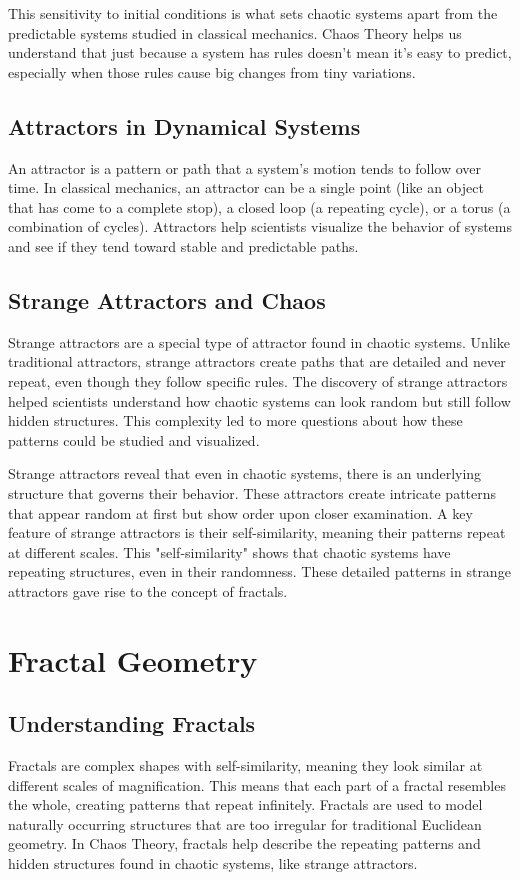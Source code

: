 \documentclass[12pt]{article}
\begin{document}
This sensitivity to initial conditions is what sets chaotic systems apart from the predictable systems studied in classical mechanics. Chaos Theory helps us understand that just because a system has rules doesn’t mean it’s easy to predict, especially when those rules cause big changes from tiny variations.

\subsection{Attractors in Dynamical Systems}
An attractor is a pattern or path that a system’s motion tends to follow over time. In classical mechanics, an attractor can be a single point (like an object that has come to a complete stop), a closed loop (a repeating cycle), or a torus (a combination of cycles). Attractors help scientists visualize the behavior of systems and see if they tend toward stable and predictable paths.

\subsection{Strange Attractors and Chaos}
Strange attractors are a special type of attractor found in chaotic systems. Unlike traditional attractors, strange attractors create paths that are detailed and never repeat, even though they follow specific rules. The discovery of strange attractors helped scientists understand how chaotic systems can look random but still follow hidden structures. This complexity led to more questions about how these patterns could be studied and visualized.

Strange attractors reveal that even in chaotic systems, there is an underlying structure that governs their behavior. These attractors create intricate patterns that appear random at first but show order upon closer examination. A key feature of strange attractors is their self-similarity, meaning their patterns repeat at different scales. This "self-similarity" shows that chaotic systems have repeating structures, even in their randomness. These detailed patterns in strange attractors gave rise to the concept of fractals.

\section{Fractal Geometry}


\subsection{Understanding Fractals}
Fractals are complex shapes with self-similarity, meaning they look similar at different scales of magnification. This means that each part of a fractal resembles the whole, creating patterns that repeat infinitely. Fractals are used to model naturally occurring structures that are too irregular for traditional Euclidean geometry. In Chaos Theory, fractals help describe the repeating patterns and hidden structures found in chaotic systems, like strange attractors. 
\end{document}
